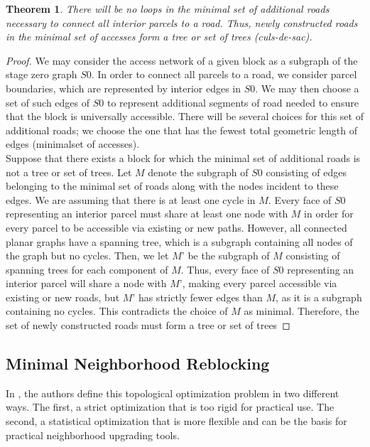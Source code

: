 \documentclass[10pt]{article}
\newtheorem{theorem}{Theorem}
\begin{document}
\begin{theorem}
    There will be no loops in the minimal set of additional roads necessary to connect all interior parcels to a road. Thus, newly constructed roads in the minimal set of accesses form a tree or set of trees (culs-de-sac).
\end{theorem}
\begin{proof}
We may consider the access network of a given block as a subgraph of the stage zero graph $S0$. In order to connect all parcels to a road, we consider parcel boundaries, which are represented by interior edges in $S0$. We may then choose a set of such edges of $S0$ to represent additional segments of road needed to ensure that the block is universally accessible. There will be several choices for this set of additional roads; we choose the one that has the fewest total geometric length of edges (minimalset of accesses).\\

Suppose that there exists a block for which the minimal set of additional roads is not a tree or set of trees. Let $M$ denote the subgraph of $S0$ consisting of edges belonging to the minimal set of roads along with the nodes incident to these edges. We are assuming that there is at least one cycle in $M$. Every face of $S0$ representing an interior parcel must share at least one node with $M$ in order for every parcel to be accessible via existing or new paths. However, all connected planar graphs have a spanning tree, which is a subgraph containing all nodes of the graph but no cycles. Then, we let $M’$ be the subgraph of $M$ consisting of spanning trees for each component of $M$. Thus, every face of $S0$ representing an interior parcel will share a node with $M’$, making every parcel accessible via existing or new roads, but $M’$ has strictly fewer edges than $M$, as it is a subgraph containing no cycles. This contradicts the choice of $M$ as minimal. Therefore, the set of newly constructed roads must form a tree or set of trees
\end{proof}

\subsection{Minimal Neighborhood Reblocking}

 In \cite{bre}, the authors define this topological optimization problem in two different ways. The first, a strict optimization that is too rigid for practical use. The second, a statistical optimization that is more flexible and can be the basis for practical neighborhood upgrading tools.\\
\end{document}
